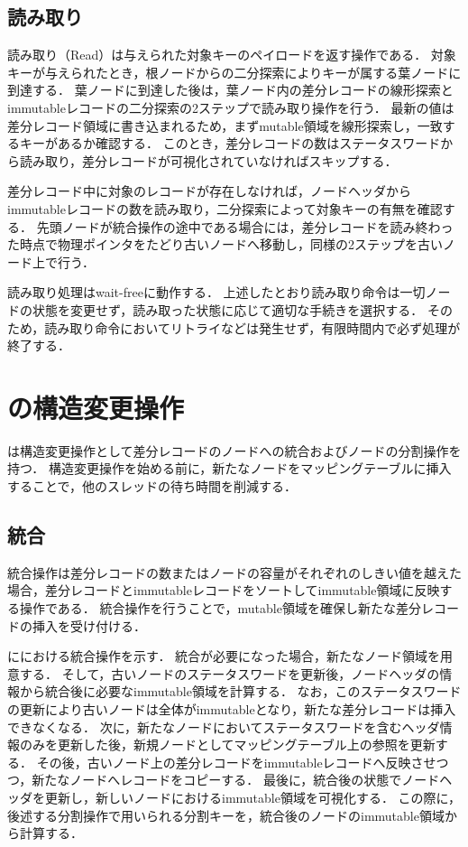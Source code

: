 \subsection{読み取り}

読み取り（Read）は与えられた対象キーのペイロードを返す操作である．
対象キーが与えられたとき，根ノードからの二分探索によりキーが属する葉ノードに到達する．
葉ノードに到達した後は，葉ノード内の差分レコードの線形探索とimmutableレコードの二分探索の2ステップで読み取り操作を行う．
最新の値は差分レコード領域に書き込まれるため，まずmutable領域を線形探索し，一致するキーがあるか確認する．
このとき，差分レコードの数はステータスワードから読み取り，差分レコードが可視化されていなければスキップする．

差分レコード中に対象のレコードが存在しなければ，ノードヘッダからimmutableレコードの数を読み取り，二分探索によって対象キーの有無を確認する．
先頭ノードが統合操作の途中である場合には，差分レコードを読み終わった時点で物理ポインタをたどり古いノードへ移動し，同様の2ステップを古いノード上で行う．

読み取り処理はwait-freeに動作する．
上述したとおり読み取り命令は一切ノードの状態を変更せず，読み取った状態に応じて適切な手続きを選択する．
そのため，読み取り命令においてリトライなどは発生せず，有限時間内で必ず処理が終了する．

\section{\Bctree{}の構造変更操作}
\label{sec:smo}

\Bctree{}は構造変更操作として差分レコードのノードへの統合およびノードの分割操作を持つ．
構造変更操作を始める前に，新たなノードをマッピングテーブルに挿入することで，他のスレッドの待ち時間を削減する．

\subsection{統合}

統合操作は差分レコードの数またはノードの容量がそれぞれのしきい値を越えた場合，差分レコードとimmutableレコードをソートしてimmutable領域に反映する操作である．
統合操作を行うことで，mutable領域を確保し新たな差分レコードの挿入を受け付ける．

\Fig{\ref{fig:bc_tree_consolidastion}}に\Bctree{}における統合操作を示す．
統合が必要になった場合，新たなノード領域を用意する．
そして，古いノードのステータスワードを更新後，ノードヘッダの情報から統合後に必要なimmutable領域を計算する．
なお，このステータスワードの更新により古いノードは全体がimmutableとなり，新たな差分レコードは挿入できなくなる．
次に，新たなノードにおいてステータスワードを含むヘッダ情報のみを更新した後，新規ノードとしてマッピングテーブル上の参照を更新する．
その後，古いノード上の差分レコードをimmutableレコードへ反映させつつ，新たなノードへレコードをコピーする．
最後に，統合後の状態でノードヘッダを更新し，新しいノードにおけるimmutable領域を可視化する．
この際に，後述する分割操作で用いられる分割キーを，統合後のノードのimmutable領域から計算する．

